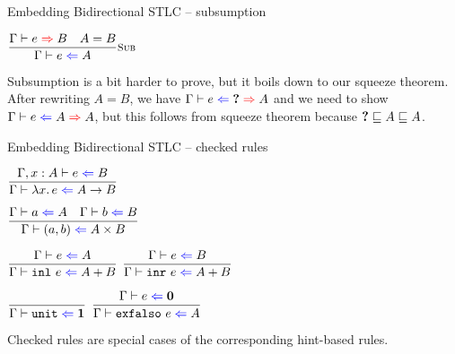 \documentclass{beamer}
\begin{document}
\begin{frame}{Embedding Bidirectional STLC -- subsumption}

\begin{center}
  $\infrule[Sub]{\infer{e}{B} \quad \sidecond{A = B}}{\check{e}{A}}$
\end{center}

\vspace{2em}

Subsumption is a bit harder to prove, but it boils down to our squeeze theorem. After rewriting $A = B$, we have $\hinting{e}{\Hole}{A}$ and we need to show $\hinting{e}{A}{A}$, but this follows from squeeze theorem because $\textbf{?} \sqsubseteq A \sqsubseteq A$.

\end{frame}

\begin{frame}{Embedding Bidirectional STLC -- checked rules}

\begin{center}
  $\infrule{\fullcheck{\extend{\Gamma}{x}{A}}{e}{B}}{\check{\fun{x}{e}}{\Fun{A}{B}}}$

  \vspace{2em}

  $\infrule{\check{a}{A} \quad \check{b}{B}}{\check{\pair{a}{b}}{\Prod{A}{B}}}$

  \vspace{2em}

  $\infrule{\check{e}{A}}{\check{\inl{e}}{\Sum{A}{B}}}$ \quad
  $\infrule{\check{e}{B}}{\check{\inr{e}}{\Sum{A}{B}}}$

  \vspace{2em}

  $\infrule{}{\check{\unit}{\Unit}}$ \quad
  $\infrule{\check{e}{\Empty}}{\check{\exfalso{e}}{A}}$
\end{center}

\vspace{1em}

Checked rules are special cases of the corresponding hint-based rules.

\end{frame}
\end{document}
